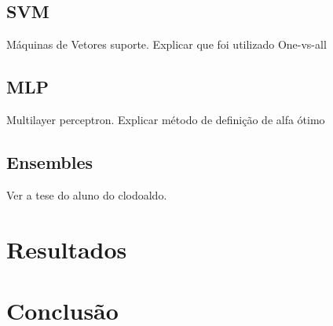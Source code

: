 \documentclass[conference]{IEEEtran}
\begin{document}
\subsection{SVM}
Máquinas de Vetores suporte.
Explicar que foi utilizado One-vs-all


\subsection{MLP}
Multilayer perceptron.
Explicar método de definição de alfa ótimo

\subsection{Ensembles}
Ver a tese do aluno do clodoaldo.

\section{Resultados}

\section{Conclusão}






\end{document}
